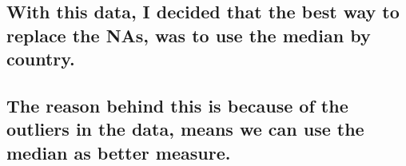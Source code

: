 \documentclass[]{article}
\newenvironment{Shaded}{\begin{snugshade}}{\end{snugshade}}
\newcommand{\ControlFlowTok}[1]{\textcolor[rgb]{0.13,0.29,0.53}{\textbf{#1}}}
\newcommand{\DataTypeTok}[1]{\textcolor[rgb]{0.13,0.29,0.53}{#1}}
\newcommand{\FloatTok}[1]{\textcolor[rgb]{0.00,0.00,0.81}{#1}}
\newcommand{\KeywordTok}[1]{\textcolor[rgb]{0.13,0.29,0.53}{\textbf{#1}}}
\newcommand{\NormalTok}[1]{#1}
\newcommand{\OperatorTok}[1]{\textcolor[rgb]{0.81,0.36,0.00}{\textbf{#1}}}
\newcommand{\StringTok}[1]{\textcolor[rgb]{0.31,0.60,0.02}{#1}}
\begin{document}
\hypertarget{with-this-data-i-decided-that-the-best-way-to-replace-the-nas-was-to-use-the-median-by-country.}{%
\subsection{With this data, I decided that the best way to replace the
NAs, was to use the median by
country.}\label{with-this-data-i-decided-that-the-best-way-to-replace-the-nas-was-to-use-the-median-by-country.}}

\hypertarget{the-reason-behind-this-is-because-of-the-outliers-in-the-data-means-we-can-use-the-median-as-better-measure.}{%
\subsection{The reason behind this is because of the outliers in the
data, means we can use the median as better
measure.}\label{the-reason-behind-this-is-because-of-the-outliers-in-the-data-means-we-can-use-the-median-as-better-measure.}}

\begin{Shaded}
\end{Shaded}
\end{document}
